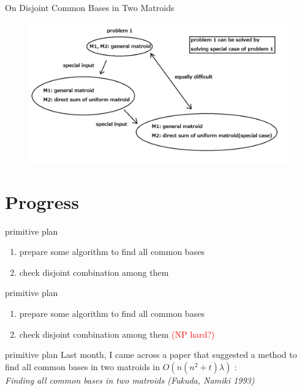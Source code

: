 \documentclass[11pt,xcolor=dvipsnames,table,dvipdfmx]{beamer}
\begin{document}
\begin{frame}{On Disjoint Common Bases in Two Matroids}
 \begin{figure}
  \centering
  \includegraphics[width=12cm]{problem1.png}
 \end{figure}
\end{frame}


\section{Progress}
\begin{frame}{primitive plan}
\begin{enumerate}
 \item prepare some algorithm to find all common bases
 \item check disjoint combination among them
\end{enumerate}
\end{frame}


\begin{frame}{primitive plan}
\begin{enumerate}
 \item prepare some algorithm to find all common bases
 \item check disjoint combination among them \textcolor{red}{(NP hard?)}
\end{enumerate}
\end{frame}


\begin{frame}{primitive plan}
 Last month, I came across a paper that suggested a method to find all common bases in two matroids in $O(n(n^2 + t)\lambda)$ : \\
 {\it Finding all common bases in two matroids (Fukuda, Namiki 1993)} \\
\end{frame}
\end{document}
